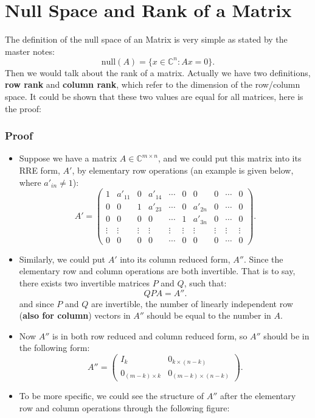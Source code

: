 \section{Null Space and Rank of a Matrix}%
The definition of the null space of an Matrix is very simple as stated by the master notes:
\[
  \text{null}(A) = \{x \in \mathbb{C}^{n}: Ax = 0\} 
.\]
Then we would talk about the rank of a matrix. Actually we have two definitions, \textbf{row rank} and \textbf{column rank}, which refer to the dimension of the row/column space. It could be shown that these two values are equal for all matrices, here is the proof:
\subsubsection*{Proof}
\begin{itemize}
  \item Suppose we have a matrix $A \in \mathbb{C}^{m \times n}$, and we could put this matrix into its RRE form, $A'$, by elementary row operations (an example is given below, where $a'_{in} \neq 1$):
  \[
    A' = \begin{pmatrix}
    1 & a'_{11} & 0 & a'_{14} &  \cdots & 0 & 0 & 0 & \cdots & 0\\
    0 & 0 & 1 & a'_{23} & \cdots & 0& a'_{2n} & 0 & \cdots & 0\\
    0 & 0 & 0 & 0 &  \cdots & 1 & a'_{3n} & 0 & \cdots & 0\\
    \vdots & \vdots & \vdots & \vdots & \vdots &\vdots & \vdots & \vdots & \vdots & \vdots \\
    0 & 0 & 0 & 0 & \cdots & 0 & 0 & 0 & \cdots & 0
    \end{pmatrix} 
  .\]
  \item Similarly, we could put $A'$ into its column reduced form,  $A''$. Since the elementary row and column operations are both invertible. That is to say, there exists two invertible matrices  $P$ and  $Q$, such that:
   \[
  QPA = A''
  .\] 
  and since $P$ and $Q$ are invertible, the number of linearly independent row (\textbf{also for column}) vectors in  $A''$ should be equal to the number in $A$.
  \item Now $A''$ is in both row reduced and column reduced form, so $A''$ should be in the following form:
   \[
  A'' = \begin{pmatrix} 
  I_k & 0_{k \times  (n - k)} \\
  0_{(m - k) \times k} & 0_{(m - k) \times (n - k)}
  \end{pmatrix}
  .\]
  \item To be more specific, we could see the structure of $A''$ after the elementary row and column operations through the following figure:

\end{itemize}
